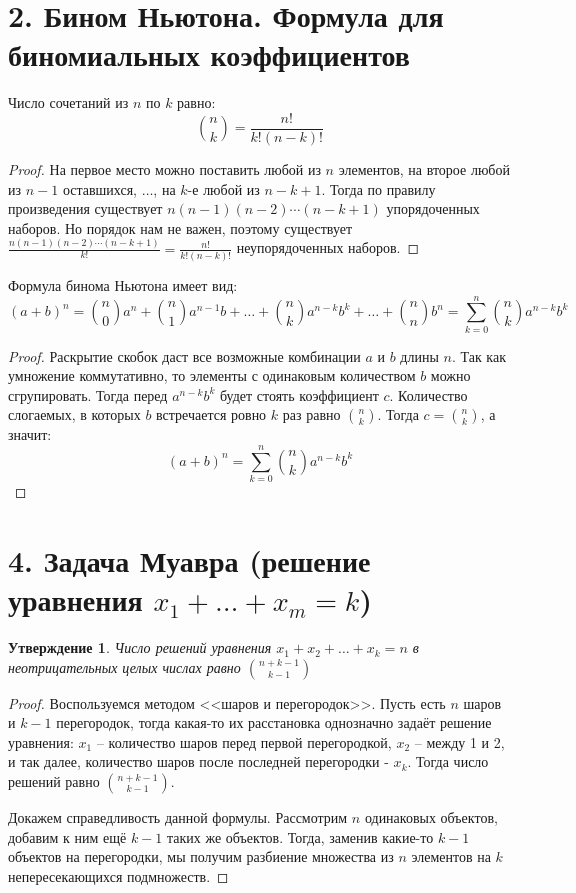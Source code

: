\documentclass[a4paper,12pt]{article}
\newtheorem*{Statements}{Утверждение}
\begin{document}
 	\section*{2. Бином Ньютона. Формула для биномиальных коэффициентов}
    Число сочетаний из $n$ по $k$ равно:
    \[
        \binom{n}{k} = \frac{n!}{k!(n - k)!}
    \]
    \begin{proof}
        На первое место можно поставить любой из $n$ элементов, на второе любой из $n - 1$ оставшихся, $\ldots$, на $k$-е любой из $n - k + 1$. Тогда по правилу произведения существует $n(n - 1)(n - 2)\cdots(n - k + 1)$ упорядоченных наборов. Но порядок нам не важен, поэтому существует $\displaystyle\frac{n(n - 1)(n - 2)\cdots(n - k + 1)}{k!} = \frac{n!}{k!(n - k)!}$ неупорядоченных наборов.
    \end{proof}
    Формула бинома Ньютона имеет вид:
    \[
        (a + b)^{n} = \binom{n}{0}a^{n} + \binom{n}{1}a^{n - 1}b + \ldots + \binom{n}{k}a^{n - k}b^{k} + \ldots + \binom{n}{n}b^{n} = \sum_{k = 0}^{n}\binom{n}{k}a^{n - k}b^{k}
    \]
    \begin{proof}
        Раскрытие скобок даст все возможные комбинации $a$ и $b$ длины $n$. Так как умножение коммутативно, то элементы с одинаковым количеством $b$ можно сгрупировать. Тогда перед $a^{n - k}b^{k}$ будет стоять коэффициент $c$. Количество слогаемых, в которых $b$ встречается ровно $k$ раз равно $\displaystyle\binom{n}{k}$. Тогда $c = \displaystyle\binom{n}{k}$, а значит:
        \[
            (a + b)^{n} = \sum_{k = 0}^{n}\binom{n}{k}a^{n - k}b^{k}
        \]
    \end{proof}

    \section*{4. Задача Муавра (решение уравнения $x_1+\ldots+x_m=k$) }
    \begin{Statements}
    Число решений уравнения $x_1 + x_2 + \ldots + x_k = n$ в неотрицательных целых
    числах равно ${n+k-1 \choose k-1}$
    \end{Statements}

    \begin{proof}
        \par Воспользуемся методом <<шаров и перегородок>>. Пусть есть $n$ шаров и
        $k-1$ перегородок, тогда какая-то их расстановка однозначно задаёт
        решение уравнения: $x_1$ --  количество шаров перед первой
        перегородкой, $x_2$ -- между 1 и 2, и так далее, количество шаров после
        последней перегородки - $x_k$. Тогда число решений равно ${n+k-1
        \choose k-1}$.
        \par Докажем справедливость данной формулы. Рассмотрим $n$ одинаковых
        объектов, добавим к ним ещё $k-1$ таких же объектов. Тогда, заменив
        какие-то $k-1$ объектов на перегородки, мы получим разбиение множества
        из $n$ элементов на $k$ непересекающихся подмножеств.
    \end{proof}
\end{document}
